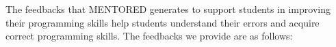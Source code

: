 \documentclass[10pt,conference]{IEEEtran}
\begin{document}


        The feedbacks that MENTORED generates to support students in improving their programming skills help students understand their errors and acquire correct programming skills. The feedbacks we provide are as follows:
\end{document}
